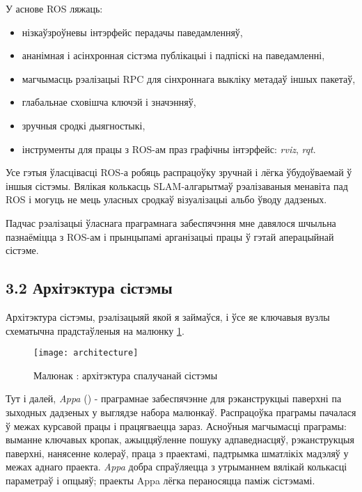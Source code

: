 У аснове ROS ляжаць:

\begin{itemize}
  \item нізкаўзроўневы інтэрфейс перадачы паведамленняў,
  \item ананімная і асінхронная сістэма публікацыі і падпіскі на паведамленні,
  \item магчымасць рэалізацыі RPC для сінхроннага выкліку метадаў іншых пакетаў,
  \item глабальнае сховішча ключэй і значэнняў,
  \item зручныя сродкі дыягностыкі,
  \item інструменты для працы з ROS-ам праз графічны інтэрфейс: \textit{rviz}, \textit{rqt}.
\end{itemize}

Усе гэтыя ўласцівасці ROS-а робяць распрацоўку зручнай і лёгка ўбудоўваемай ў іншыя сістэмы.
Вялікая колькасць SLAM-алгарытмаў рэалізаваныя менавіта пад ROS і могуць не мець
уласных сродкаў візуалізацыі альбо ўводу дадзеных.

Падчас рэалізацыі ўласнага праграмнага забеспячэння мне давялося шчыльна пазнаёміцца з ROS-ам
і прынцыпамі арганізацыі працы ў гэтай аперацыйнай сістэме.

\subsection*{3.2 Архітэктура сістэмы}

Архітэктура сістэмы, рэалізацыяй якой я займаўся, і ўсе яе ключавыя вузлы схематычна
прадстаўленыя на малюнку \ref{fig:architecture}.

\begin{figure}[H]
  \centering
  \texttt{[image: architecture]}
  \captionsetup{labelformat=empty}
  \caption{Малюнак : архітэктура спалучанай сістэмы}
  \label{fig:architecture}
\end{figure}

Тут і далей, \textit{Appa} (\cite{appa-software}) - праграмнае забеспячэнне для рэканструкцыі
паверхні па зыходных дадзеных у выглядзе набора малюнкаў. Распрацоўка праграмы пачалася
ў межах курсавой працы і працягваецца зараз. Асноўныя магчымасці праграмы: выманне ключавых кропак,
ажыццяўленне пошуку адпаведнасцяў, рэканструкцыя паверхні, нанясенне колераў, праца з праектамі,
падтрымка шматлікіх мадэляў у межах аднаго праекта. \textit{Appa} добра спраўляецца з
утрыманнем вялікай колькасці параметраў і опцыяў; праекты Appa лёгка пераносяцца паміж сістэмамі.


